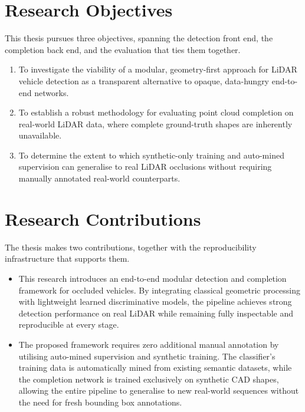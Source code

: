 \section{Research Objectives}
\label{sec:intro-objectives}

This thesis pursues three objectives, spanning the detection front end, the completion
back end, and the evaluation that ties them together.

\begin{enumerate}
  \item To investigate the viability of a modular, geometry-first approach for LiDAR vehicle detection as a transparent alternative to opaque, data-hungry end-to-end networks.
  \item To establish a robust methodology for evaluating point cloud completion on real-world LiDAR data, where complete ground-truth shapes are inherently unavailable.
  \item To determine the extent to which synthetic-only training and auto-mined supervision can generalise to real LiDAR occlusions without requiring manually annotated real-world counterparts.
\end{enumerate}

\section{Research Contributions}
\label{sec:intro-contributions}

The thesis makes two contributions, together with the reproducibility infrastructure
that supports them.

\begin{itemize}
  \item This research introduces an end-to-end modular detection and completion framework for occluded vehicles. By integrating classical geometric processing with lightweight learned discriminative models, the pipeline achieves strong detection performance on real LiDAR while remaining fully inspectable and reproducible at every stage.

  \item The proposed framework requires zero additional manual annotation by utilising auto-mined supervision and synthetic training. The classifier's training data is automatically mined from existing semantic datasets, while the completion network is trained exclusively on synthetic CAD shapes, allowing the entire pipeline to generalise to new real-world sequences without the need for fresh bounding box annotations.
\end{itemize}

